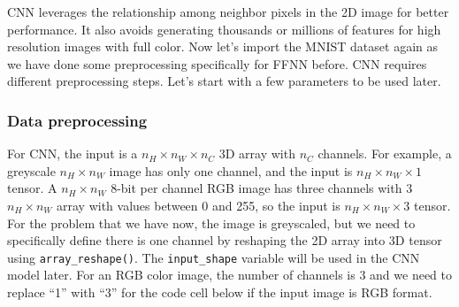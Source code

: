\documentclass[12pt,]{krantz}
\makeatletter
\newenvironment{Shaded}{\begin{snugshade}}{\end{snugshade}}
\newcommand{\CommentTok}[1]{\textcolor[rgb]{0.37,0.37,0.37}{\textit{#1}}}
\newcommand{\DecValTok}[1]{\textcolor[rgb]{0.06,0.06,0.06}{#1}}
\newcommand{\KeywordTok}[1]{\textcolor[rgb]{0.27,0.27,0.27}{\textbf{#1}}}
\newcommand{\NormalTok}[1]{#1}
\newcommand{\OperatorTok}[1]{\textcolor[rgb]{0.43,0.43,0.43}{\textbf{#1}}}
\newcommand{\StringTok}[1]{\textcolor[rgb]{0.5,0.5,0.5}{#1}}
\newenvironment{kframe}{%
\medskip{}
\setlength{\fboxsep}{.8em}
 \def\at@end@of@kframe{}%
 \ifinner\ifhmode%
  \def\at@end@of@kframe{\end{minipage}}%
  \begin{minipage}{\columnwidth}%
 \fi\fi%
 \def\FrameCommand##1{\hskip\@totalleftmargin \hskip-\fboxsep
 \colorbox{shadecolor}{##1}\hskip-\fboxsep
     \hskip-\linewidth \hskip-\@totalleftmargin \hskip\columnwidth}%
 \MakeFramed {\advance\hsize-\width
   \@totalleftmargin\z@ \linewidth\hsize
   \@setminipage}}%
 {\par\unskip\endMakeFramed%
 \at@end@of@kframe}
\renewenvironment{Shaded}{\begin{kframe}}{\end{kframe}}
\makeatother
\begin{document}
CNN leverages the relationship among neighbor pixels in the 2D image for better performance. It also avoids generating thousands or millions of features for high resolution images with full color. Now let's import the MNIST dataset again as we have done some preprocessing specifically for FFNN before. CNN requires different preprocessing steps. Let's start with a few parameters to be used later.

\begin{Shaded}
\end{Shaded}

\hypertarget{data-preprocessing-1}{%
\subsubsection{Data preprocessing}\label{data-preprocessing-1}}

For CNN, the input is a \(n_H \times n_W \times n_C\) 3D array with \(n_C\) channels. For example, a greyscale \(n_H \times n_W\) image has only one channel, and the input is \(n_H \times n_W \times 1\) tensor. A \(n_H \times n_W\) 8-bit per channel RGB image has three channels with 3 \(n_H \times n_W\) array with values between 0 and 255, so the input is \(n_H \times n_W \times 3\) tensor. For the problem that we have now, the image is greyscaled, but we need to specifically define there is one channel by reshaping the 2D array into 3D tensor using \texttt{array\_reshape()}. The \texttt{input\_shape} variable will be used in the CNN model later. For an RGB color image, the number of channels is 3 and we need to replace ``1'' with ``3'' for the code cell below if the input image is RGB format.
\end{document}
